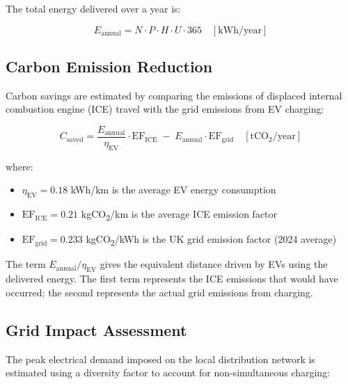 The total energy delivered over a year is:

\begin{equation}
\label{eq:energy}
E_{\text{annual}} = N \cdot P \cdot H \cdot U \cdot 365
\quad [\text{kWh/year}]
\end{equation}

\subsection{Carbon Emission Reduction}
\label{sec:carbon}

Carbon savings are estimated by comparing the emissions of displaced internal combustion engine (ICE) travel with the grid emissions from EV charging:

\begin{equation}
\label{eq:carbon}
C_{\text{saved}} = \frac{E_{\text{annual}}}{\eta_{\text{EV}}} \cdot \text{EF}_{\text{ICE}} \;-\; E_{\text{annual}} \cdot \text{EF}_{\text{grid}}
\quad [\text{tCO}_2\text{/year}]
\end{equation}

\noindent where:
\begin{itemize}[nosep]
    \item $\eta_{\text{EV}} = 0.18$ kWh/km is the average EV energy consumption
    \item $\text{EF}_{\text{ICE}} = 0.21$ kgCO\textsubscript{2}/km is the average ICE emission factor
    \item $\text{EF}_{\text{grid}} = 0.233$ kgCO\textsubscript{2}/kWh is the UK grid emission factor (2024 average)
\end{itemize}

\noindent The term $E_{\text{annual}} / \eta_{\text{EV}}$ gives the equivalent distance driven by EVs using the delivered energy. The first term represents the ICE emissions that would have occurred; the second represents the actual grid emissions from charging.

\subsection{Grid Impact Assessment}
\label{sec:grid}

The peak electrical demand imposed on the local distribution network is estimated using a diversity factor to account for non-simultaneous charging:

